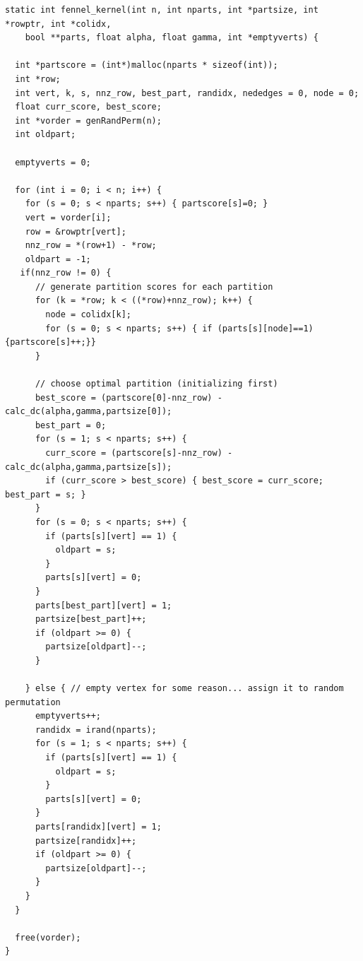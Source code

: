 \documentclass[11pt]{article}
\begin{document}
\begin{verbatim}
static int fennel_kernel(int n, int nparts, int *partsize, int *rowptr, int *colidx,
    bool **parts, float alpha, float gamma, int *emptyverts) {
      
  int *partscore = (int*)malloc(nparts * sizeof(int));
  int *row;
  int vert, k, s, nnz_row, best_part, randidx, nededges = 0, node = 0;
  float curr_score, best_score;
  int *vorder = genRandPerm(n);
  int oldpart;

  emptyverts = 0;

  for (int i = 0; i < n; i++) {
    for (s = 0; s < nparts; s++) { partscore[s]=0; }
    vert = vorder[i];
    row = &rowptr[vert];
    nnz_row = *(row+1) - *row;
    oldpart = -1;
   if(nnz_row != 0) {
      // generate partition scores for each partition
      for (k = *row; k < ((*row)+nnz_row); k++) {
        node = colidx[k];
        for (s = 0; s < nparts; s++) { if (parts[s][node]==1) {partscore[s]++;}}
      }
        
      // choose optimal partition (initializing first)
      best_score = (partscore[0]-nnz_row) - calc_dc(alpha,gamma,partsize[0]);
      best_part = 0;
      for (s = 1; s < nparts; s++) {
        curr_score = (partscore[s]-nnz_row) - calc_dc(alpha,gamma,partsize[s]);
        if (curr_score > best_score) { best_score = curr_score; best_part = s; }
      }
      for (s = 0; s < nparts; s++) { 
        if (parts[s][vert] == 1) {
          oldpart = s;
        }
        parts[s][vert] = 0; 
      }
      parts[best_part][vert] = 1;
      partsize[best_part]++;
      if (oldpart >= 0) {
        partsize[oldpart]--;
      }
      
    } else { // empty vertex for some reason... assign it to random permutation
      emptyverts++;
      randidx = irand(nparts);
      for (s = 1; s < nparts; s++) {
        if (parts[s][vert] == 1) {
          oldpart = s;
        }
        parts[s][vert] = 0; 
      }
      parts[randidx][vert] = 1;
      partsize[randidx]++;
      if (oldpart >= 0) {
        partsize[oldpart]--;
      }
    }
  }
  
  free(vorder);
}
\end{verbatim}
\end{document}
